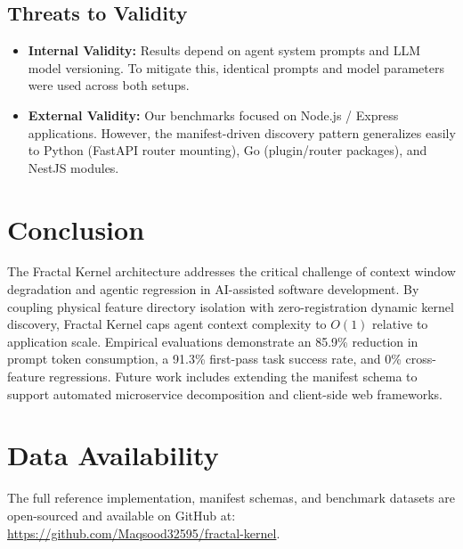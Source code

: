 \documentclass[conference]{IEEEtran}
\begin{document}
\subsection{Threats to Validity}
\begin{itemize}
    \item \textbf{Internal Validity:} Results depend on agent system prompts and LLM model versioning. To mitigate this, identical prompts and model parameters were used across both setups.
    \item \textbf{External Validity:} Our benchmarks focused on Node.js / Express applications. However, the manifest-driven discovery pattern generalizes easily to Python (FastAPI router mounting), Go (plugin/router packages), and NestJS modules.
\end{itemize}

\section{Conclusion}
The Fractal Kernel architecture addresses the critical challenge of context window degradation and agentic regression in AI-assisted software development. By coupling physical feature directory isolation with zero-registration dynamic kernel discovery, Fractal Kernel caps agent context complexity to $O(1)$ relative to application scale. Empirical evaluations demonstrate an 85.9\% reduction in prompt token consumption, a 91.3\% first-pass task success rate, and 0\% cross-feature regressions. Future work includes extending the manifest schema to support automated microservice decomposition and client-side web frameworks.

\section*{Data Availability}
The full reference implementation, manifest schemas, and benchmark datasets are open-sourced and available on GitHub at: \url{https://github.com/Maqsood32595/fractal-kernel}.
\end{document}
